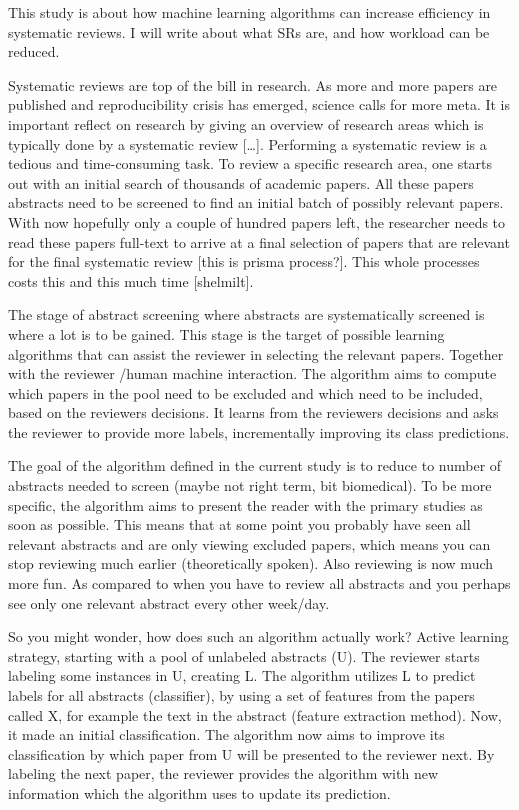 \documentclass[
]{article}
\begin{document}
This study is about how machine learning algorithms can increase
efficiency in systematic reviews. I will write about what SRs are, and
how workload can be reduced.

Systematic reviews are top of the bill in research. As more and more
papers are published and reproducibility crisis has emerged, science
calls for more meta. It is important reflect on research by giving an
overview of research areas which is typically done by a systematic
review {[}\ldots{]}. Performing a systematic review is a tedious and
time-consuming task. To review a specific research area, one starts out
with an initial search of thousands of academic papers. All these papers
abstracts need to be screened to find an initial batch of possibly
relevant papers. With now hopefully only a couple of hundred papers
left, the researcher needs to read these papers full-text to arrive at a
final selection of papers that are relevant for the final systematic
review {[}this is prisma process?{]}. This whole processes costs this
and this much time {[}shelmilt{]}.

The stage of abstract screening where abstracts are systematically
screened is where a lot is to be gained. This stage is the target of
possible learning algorithms that can assist the reviewer in selecting
the relevant papers. Together with the reviewer /human machine
interaction. The algorithm aims to compute which papers in the pool need
to be excluded and which need to be included, based on the reviewers
decisions. It learns from the reviewers decisions and asks the reviewer
to provide more labels, incrementally improving its class predictions.

The goal of the algorithm defined in the current study is to reduce to
number of abstracts needed to screen (maybe not right term, bit
biomedical). To be more specific, the algorithm aims to present the
reader with the primary studies as soon as possible. This means that at
some point you probably have seen all relevant abstracts and are only
viewing excluded papers, which means you can stop reviewing much earlier
(theoretically spoken). Also reviewing is now much more fun. As compared
to when you have to review all abstracts and you perhaps see only one
relevant abstract every other week/day.

So you might wonder, how does such an algorithm actually work? Active
learning strategy, starting with a pool of unlabeled abstracts (U). The
reviewer starts labeling some instances in U, creating L. The algorithm
utilizes L to predict labels for all abstracts (classifier), by using a
set of features from the papers called X, for example the text in the
abstract (feature extraction method). Now, it made an initial
classification. The algorithm now aims to improve its classification by
which paper from U will be presented to the reviewer next. By labeling
the next paper, the reviewer provides the algorithm with new information
which the algorithm uses to update its prediction.
\end{document}
